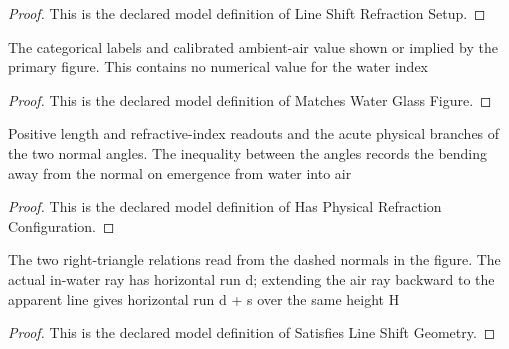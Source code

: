 \begin{proof}
  This is the declared model definition of Line Shift Refraction Setup.
\end{proof}
\begin{definition}
  \label{def:physics:phyx-mini-0095:phyxminiproblems-problemphyxmini0095-matcheswaterglassfigure}
  The categorical labels and calibrated ambient-air value shown or implied by the primary figure. This contains no numerical value for the water index
\end{definition}
\begin{proof}
  This is the declared model definition of Matches Water Glass Figure.
\end{proof}
\begin{definition}
  \label{def:physics:phyx-mini-0095:phyxminiproblems-problemphyxmini0095-hasphysicalrefractionconfiguration}
  Positive length and refractive-index readouts and the acute physical branches of the two normal angles. The inequality between the angles records the bending away from the normal on emergence from water into air
\end{definition}
\begin{proof}
  This is the declared model definition of Has Physical Refraction Configuration.
\end{proof}
\begin{definition}
  \label{def:physics:phyx-mini-0095:phyxminiproblems-problemphyxmini0095-satisfieslineshiftgeometry}
  The two right-triangle relations read from the dashed normals in the figure. The actual in-water ray has horizontal run d; extending the air ray backward to the apparent line gives horizontal run d + s over the same height H
\end{definition}
\begin{proof}
  This is the declared model definition of Satisfies Line Shift Geometry.
\end{proof}

